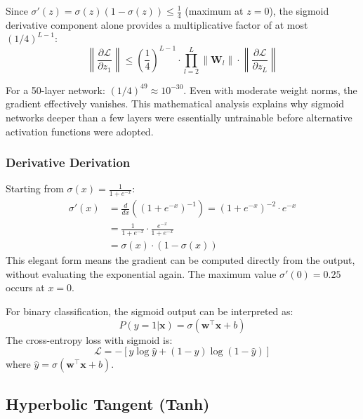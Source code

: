 Since $\sigma'(z) = \sigma(z)(1-\sigma(z)) \leq \frac{1}{4}$ (maximum at $z=0$), the sigmoid derivative component alone provides a multiplicative factor of at most $(1/4)^{L-1}$:
\begin{equation}
\left\|\frac{\partial \mathcal{L}}{\partial z_1}\right\| \leq \left(\frac{1}{4}\right)^{L-1} \cdot \prod_{l=2}^{L} \|\mathbf{W}_l\| \cdot \left\|\frac{\partial \mathcal{L}}{\partial z_L}\right\|
\end{equation}

For a 50-layer network: $(1/4)^{49} \approx 10^{-30}$. Even with moderate weight norms, the gradient effectively vanishes. This mathematical analysis explains why sigmoid networks deeper than a few layers were essentially untrainable before alternative activation functions were adopted.

\subsubsection{Derivative Derivation}

Starting from $\sigma(x) = \frac{1}{1 + e^{-x}}$:
\begin{align}
\sigma'(x) &= \frac{d}{dx}\left((1 + e^{-x})^{-1}\right) = (1 + e^{-x})^{-2} \cdot e^{-x} \\
&= \frac{1}{1 + e^{-x}} \cdot \frac{e^{-x}}{1 + e^{-x}} \\
&= \sigma(x) \cdot (1 - \sigma(x))
\end{align}
This elegant form means the gradient can be computed directly from the output, without evaluating the exponential again. The maximum value $\sigma'(0) = 0.25$ occurs at $x = 0$.

\begin{example}
For binary classification, the sigmoid output can be interpreted as:
\begin{equation}
P(y=1|\mathbf{x}) = \sigma(\mathbf{w}^\top \mathbf{x} + b)
\end{equation}
The cross-entropy loss with sigmoid is:
\begin{equation}
\mathcal{L} = -[y \log \hat{y} + (1-y) \log(1-\hat{y})]
\end{equation}
where $\hat{y} = \sigma(\mathbf{w}^\top \mathbf{x} + b)$.
\end{example}

\subsection{Hyperbolic Tangent (Tanh)}

